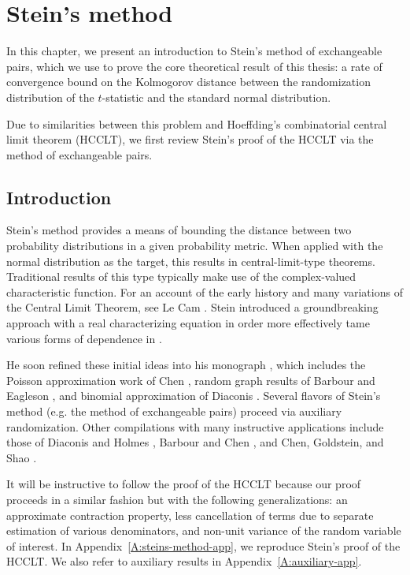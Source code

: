 \chapter{Stein's method}
\label{C:steins-method}
In this chapter, we present an introduction to
Stein's method of exchangeable pairs, which we use to prove the core
theoretical result of this thesis: a rate of convergence bound on the
Kolmogorov distance between the randomization distribution of the $t$-statistic
and the standard normal distribution.

Due to similarities between this problem and Hoeffding's combinatorial central
limit theorem (HCCLT), we first review Stein's proof of the HCCLT via the method
of exchangeable pairs.

\section{Introduction}
\label{S:steins-method-introduction}
Stein's method provides a means of bounding the distance between two
probability distributions in a given probability metric.  When applied
with the normal distribution as the target, this results in
central-limit-type theorems.  Traditional results of this type
typically make use of the complex-valued characteristic function.  For
an account of the early history and many variations of the Central
Limit Theorem, see Le Cam \cite{cam1986central}.  Stein introduced a
groundbreaking approach with a real characterizing equation in order
more effectively tame various forms of dependence in
\cite{stein1972bound}.

He soon refined these initial ideas into his monograph
\cite{stein1986approximate}, which includes the Poisson approximation
work of Chen \cite{chen1975poisson}, random graph results of Barbour
and Eagleson \cite{barbour1985multiple}, and binomial approximation of
Diaconis \cite{diaconis1977distribution}.  Several flavors of Stein's
method (e.g. the method of exchangeable pairs) proceed via auxiliary
randomization.  Other compilations with many instructive applications
include those of Diaconis and Holmes \cite{diaconis2004stein}, Barbour
and Chen \cite{barbour2005introduction, barbour2005stein}, and
Chen, Goldstein, and Shao \cite{chen2010normal}.

It will be instructive to follow the proof of the HCCLT
because our proof proceeds in a similar fashion but with the following
generalizations: an approximate contraction property, less
cancellation of terms due to separate estimation of various
denominators, and non-unit variance of the random variable of interest.
In Appendix~\ref{A:steins-method-app}, we reproduce
Stein's \cite{stein1986approximate} proof of the HCCLT.
We also refer to auxiliary results in Appendix~\ref{A:auxiliary-app}.

